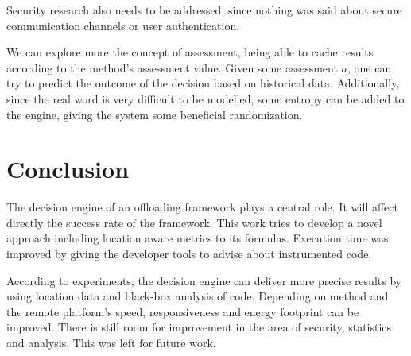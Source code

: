 \documentclass[10pt, conference, letterpaper]{IEEEtran}
\begin{document}
  Security research also needs to be addressed, since nothing was said about secure communication channels or user authentication.

  We can explore more the concept of assessment, being able to cache results according to the method's assessment value. Given some assessment $a$, one can try to predict the outcome of the decision based on historical data. Additionally, since the real word is very difficult to be modelled, some entropy can be added to the engine, giving the system some beneficial randomization.  

  \section{Conclusion}

  The decision engine of an offloading framework plays a central role. It will affect directly the success rate of the framework. This work tries to develop a novel approach including location aware metrics to its formulas. Execution time was improved by giving the developer tools to advise about instrumented code.

  According to experiments, the decision engine can deliver more precise results by using location data and black-box analysis of code. Depending on method and the remote platform's speed, responsiveness and energy footprint can be improved. There is still room for improvement in the area of security, statistics and analysis. This was left for future work.





\end{document}
